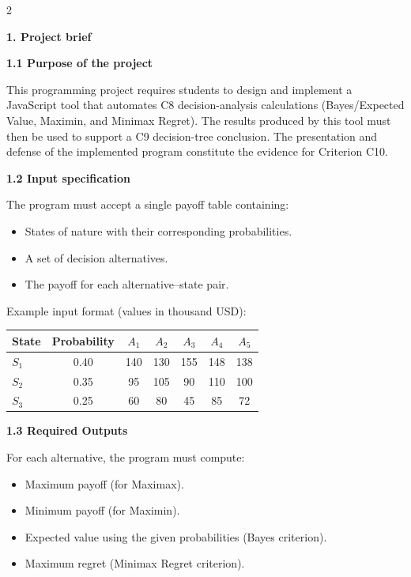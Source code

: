 \documentclass[12pt]{article}
\newcommand{\SubsectionBox}[1]{%
	\noindent\colorbox{gray!30}{%
		\parbox{\linewidth}{\textbf{#1}}%
	}\par\vspace{0.35cm}%
}
\begin{document}
	\begin{multicols}{2}
		
		\vspace{0.25cm}
		\SubsectionBox{1. Project brief}\vspace{-0.25cm}
		
		\textbf{1.1 Purpose of the project}\par
		This programming project requires students to design and implement a JavaScript tool that automates C8 decision-analysis calculations (Bayes/Expected Value, Maximin, and Minimax Regret).  
		The results produced by this tool must then be used to support a C9 decision-tree conclusion.  
		The presentation and defense of the implemented program constitute the evidence for Criterion C10.
		
		\vspace{0.25cm}
		\textbf{1.2 Input specification}\par
		The program must accept a single payoff table containing:
		\begin{itemize}
			\item States of nature with their corresponding probabilities.
			\item A set of decision alternatives.
			\item The payoff for each alternative–state pair.
		\end{itemize}
		
		Example input format (values in thousand USD):
		
		\begin{center}
			\begin{tabular}{l c c c c c c}
				\hline
				State & Probability & $A_1$ & $A_2$ & $A_3$ & $A_4$ & $A_5$ \\
				\hline
				$S_1$ & 0.40 & 140 & 130 & 155 & 148 & 138 \\
				$S_2$ & 0.35 & 95 & 105 & 90 & 110 & 100 \\
				$S_3$ & 0.25 & 60 & 80 & 45 & 85 & 72 \\
				\hline
			\end{tabular}
		\end{center}
		
		\vspace{0.25cm}
		\textbf{1.3 Required Outputs}\par
		For each alternative, the program must compute:
		
		\begin{itemize}
			\item Maximum payoff (for Maximax).
			\item Minimum payoff (for Maximin).
			\item Expected value using the given probabilities (Bayes criterion).
			\item Maximum regret (Minimax Regret criterion).
		\end{itemize}
		

\end{multicols}
\end{document}
